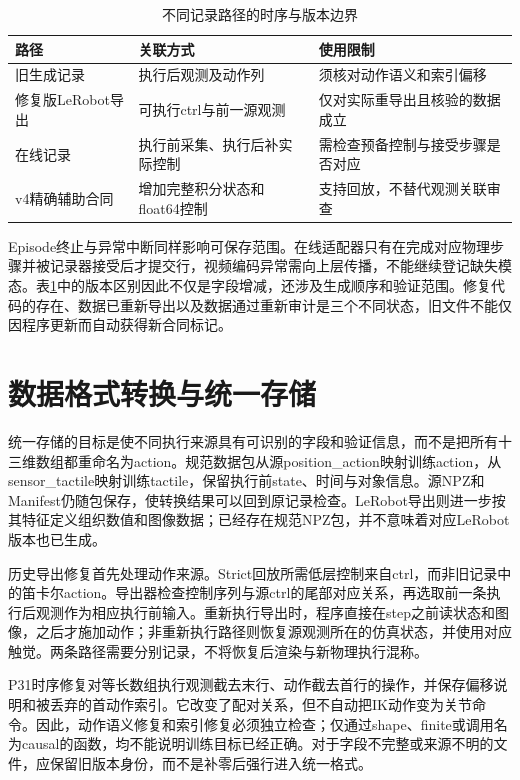 \begin{table}[htbp]
 \centering\small
 \caption{不同记录路径的时序与版本边界}
 \label{tab:ch04_recording_versions}
 \begin{tabular}{p{}p{}p{}}
 \hline
 路径 & 关联方式 & 使用限制\\
 \hline
 旧生成记录 & 执行后观测及动作列 & 须核对动作语义和索引偏移\\
 修复版LeRobot导出 & 可执行ctrl与前一源观测 & 仅对实际重导出且核验的数据成立\\
 在线记录 & 执行前采集、执行后补实际控制 & 需检查预备控制与接受步骤是否对应\\
 v4精确辅助合同 & 增加完整积分状态和float64控制 & 支持回放，不替代观测关联审查\\
 \hline
 \end{tabular}
\end{table}

Episode终止与异常中断同样影响可保存范围。在线适配器只有在完成对应物理步骤并被记录器接受后才提交行，视频编码异常需向上层传播，不能继续登记缺失模态。表\ref{tab:ch04_recording_versions}中的版本区别因此不仅是字段增减，还涉及生成顺序和验证范围。修复代码的存在、数据已重新导出以及数据通过重新审计是三个不同状态，旧文件不能仅因程序更新而自动获得新合同标记。

\section{数据格式转换与统一存储}
\label{sec:data_conversion}

统一存储的目标是使不同执行来源具有可识别的字段和验证信息，而不是把所有十三维数组都重命名为action。规范数据包从源position\_action映射训练action，从sensor\_tactile映射训练tactile，保留执行前state、时间与对象信息。源NPZ和Manifest仍随包保存，使转换结果可以回到原记录检查。LeRobot导出则进一步按其特征定义组织数值和图像数据；已经存在规范NPZ包，并不意味着对应LeRobot版本也已生成。

历史导出修复首先处理动作来源。Strict回放所需低层控制来自ctrl，而非旧记录中的笛卡尔action。导出器检查控制序列与源ctrl的尾部对应关系，再选取前一条执行后观测作为相应执行前输入。重新执行导出时，程序直接在step之前读状态和图像，之后才施加动作；非重新执行路径则恢复源观测所在的仿真状态，并使用对应触觉。两条路径需要分别记录，不将恢复后渲染与新物理执行混称。

P31时序修复对等长数组执行观测截去末行、动作截去首行的操作，并保存偏移说明和被丢弃的首动作索引。它改变了配对关系，但不自动把IK动作变为关节命令。因此，动作语义修复和索引修复必须独立检查；仅通过shape、finite或调用名为causal的函数，均不能说明训练目标已经正确。对于字段不完整或来源不明的文件，应保留旧版本身份，而不是补零后强行进入统一格式。

